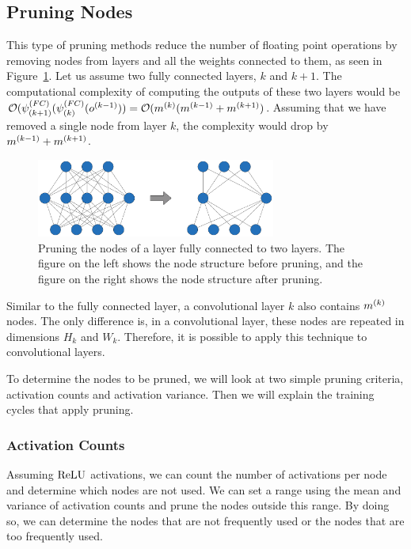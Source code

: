 \newpage
\subsection{Pruning Nodes}
\label{sec:pruning_nodes}
This type of pruning methods reduce the number of floating point operations by removing nodes from layers and all the weights connected to them, as seen in Figure~\ref{fig:node_pruning}. Let us assume two fully connected layers, $k$ and $k+1$. The computational complexity of computing the outputs of these two layers would be $\mathcal{O}(\psi^{(FC)}_{(k+1)}(\psi^{(FC)}_{(k)}(o^{(k-1)})) = \mathcal{O}(m^{(k)}(m^{(k-1)} + m^{(k+1)})$. Assuming that we have removed a single node from layer $k$, the complexity would drop by $m^{(k-1)} + m^{(k+1)}$. 

\begin{figure}[!h]
  \begin{center}
  \includegraphics[width=0.7\textwidth]{images/node_pruning.pdf}
  \end{center}
  \caption{Pruning the nodes of a layer fully connected to two layers. The figure on the left shows the node structure before pruning, and the figure on the right shows the node structure after pruning.}
  \label{fig:node_pruning}
\end{figure}

Similar to the fully connected layer, a convolutional layer $k$ also contains $m^{(k)}$ nodes. The only difference is, in a convolutional layer, these nodes are repeated in dimensions $H_k$ and $W_k$. Therefore, it is possible to apply this technique to convolutional layers. 

To determine the nodes to be pruned, we will look at two simple pruning criteria, activation counts and activation variance. Then we will explain the training cycles that apply pruning.

\subsubsection{Activation Counts}
Assuming $\textrm{ReLU}$ activations, we can count the number of activations per node and determine which nodes are not used. We can set a range using the mean and variance of activation counts and prune the nodes outside this range. By doing so, we can determine the nodes that are not frequently used or the nodes that are too frequently used.

